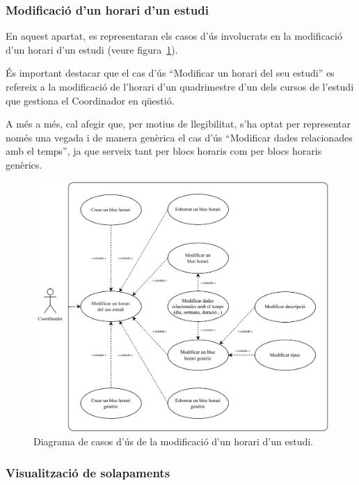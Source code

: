 \documentclass[a4paper,12pt]{ThesisStyle}
\begin{document}
\newpage

\subsubsection{Modificació d'un horari d'un estudi}

En aquest apartat, es representaran els casos d'ús involucrats en la modificació d'un horari d'un estudi (veure figura~\ref{img:casos_us_horaris_modif}).

És important destacar que el cas d'ús ``Modificar un horari del seu estudi'' es refereix a la modificació de l'horari d'un quadrimestre d'un dels cursos de l'estudi que gestiona el Coordinador en qüestió.

A més a més, cal afegir que, per motius de llegibilitat, s'ha optat per representar només una vegada i de manera genèrica el cas d'ús ``Modificar dades relacionades amb el temps'', ja que serveix tant per blocs horaris com per blocs horaris genèrics.

\begin{figure}[H]
  \centering
  \includegraphics[width=\textwidth]{assets/use_cases/horaris/modificar/modif.pdf}
  \caption{\label{img:casos_us_horaris_modif}Diagrama de casos d'ús de la modificació d'un horari d'un estudi.}
\end{figure}

\newpage

\subsubsection{Visualització de solapaments}
\end{document}
